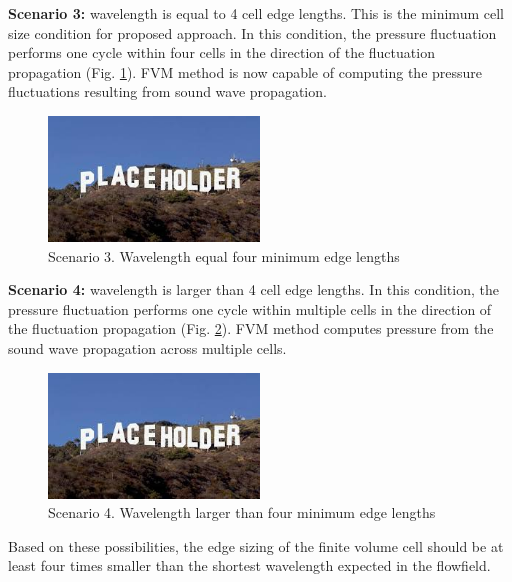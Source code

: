 \textbf{Scenario 3:} wavelength is equal to 4 cell edge lengths. This is the minimum cell size condition for proposed approach. In this condition, the pressure fluctuation performs one cycle within four cells in the direction of the fluctuation propagation (Fig. \ref{scen3}). FVM method is now capable of computing the pressure fluctuations resulting from sound wave propagation.

\begin{figure}[h!]
\centering %
\includegraphics[width=0.5\textwidth]{Pictures/placeholder.jpg}
\caption{Scenario 3. Wavelength equal four minimum edge lengths}
\label{scen3}
\end{figure}

\textbf{Scenario 4:} wavelength is larger than 4 cell edge lengths. In this condition, the pressure fluctuation performs one cycle within multiple cells in the direction of the fluctuation propagation (Fig. \ref{scen4}). FVM method computes pressure from the sound wave propagation across multiple cells.

\begin{figure}[h!]
\centering %
\includegraphics[width=0.5\textwidth]{Pictures/placeholder.jpg}
\caption{Scenario 4. Wavelength larger than four minimum edge lengths}
\label{scen4}
\end{figure}

Based on these possibilities, the edge sizing of the finite volume cell should be at least four times smaller than the shortest wavelength expected in the flowfield.

